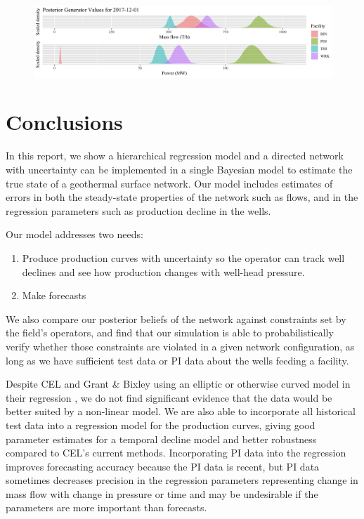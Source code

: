 \documentclass[a4paper, 12pt]{article}
\begin{document}
\begin{figure}
\centering
  \includegraphics[width=\linewidth]{media/gens}
  \label{fig:gens}
\end{figure}

\section{Conclusions}
In this report, we show a hierarchical regression model and a directed network with uncertainty can be implemented in a single Bayesian model to estimate the true state of a geothermal surface network. Our model includes estimates of errors in both the steady-state properties of the network such as flows, and in the regression parameters such as production decline in the wells.

Our model addresses two needs:
\begin{enumerate}
\item Produce production curves with uncertainty so the operator can track well declines and see how production changes with well-head pressure.
\item Make forecasts
\end{enumerate}
We also compare our posterior beliefs of the network against constraints set by the field's operators, and find that our simulation is able to probabilistically verify whether those constraints are violated in a given network configuration, as long as we have sufficient test data or PI data about the wells feeding a facility.

Despite CEL and Grant \& Bixley using an elliptic or otherwise curved model in their regression \cite{Grant:2011}, we do not find significant evidence that the data would be better suited by a non-linear model. We are also able to incorporate all historical test data into a regression model for the production curves, giving good parameter estimates for a temporal decline model and better robustness compared to CEL's current methods. Incorporating PI data into the regression improves forecasting accuracy because the PI data is recent, but PI data sometimes decreases precision in the regression parameters representing change in mass flow with change in pressure or time and may be undesirable if the parameters are more important than forecasts.
\end{document}
